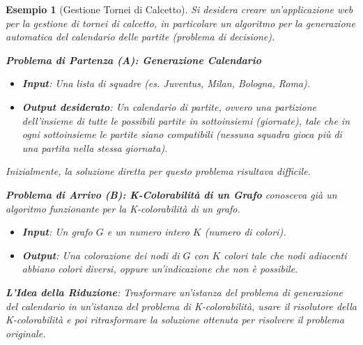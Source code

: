 \documentclass[a4paper]{article}
\newtheorem{example}[theorem]{Esempio}
\begin{document}
\begin{example}[Gestione Tornei di Calcetto]
Si desidera creare un'applicazione web per la gestione di tornei di calcetto, in particolare un algoritmo per la generazione automatica del calendario delle partite (problema di decisione).

\textbf{Problema di Partenza (A): Generazione Calendario}
\begin{itemize}
    \item \textbf{Input}: Una lista di squadre (es. Juventus, Milan, Bologna, Roma).
    \item \textbf{Output desiderato}: Un calendario di partite, ovvero una partizione dell'insieme di tutte le possibili partite in sottoinsiemi (giornate), tale che in ogni sottoinsieme le partite siano compatibili (nessuna squadra gioca più di una partita nella stessa giornata).
\end{itemize}
Inizialmente, la soluzione diretta per questo problema risultava difficile.

\textbf{Problema di Arrivo (B): K-Colorabilità di un Grafo}
\Si conosceva già un algoritmo funzionante per la K-colorabilità di un grafo.
\begin{itemize}
    \item \textbf{Input}: Un grafo $G$ e un numero intero $K$ (numero di colori).
    \item \textbf{Output}: Una colorazione dei nodi di $G$ con $K$ colori tale che nodi adiacenti abbiano colori diversi, oppure un'indicazione che non è possibile.
\end{itemize}

\textbf{L'Idea della Riduzione}: Trasformare un'istanza del problema di generazione del calendario in un'istanza del problema di K-colorabilità, usare il risolutore della K-colorabilità e poi ritrasformare la soluzione ottenuta per risolvere il problema originale.


\end{example}
\end{document}
